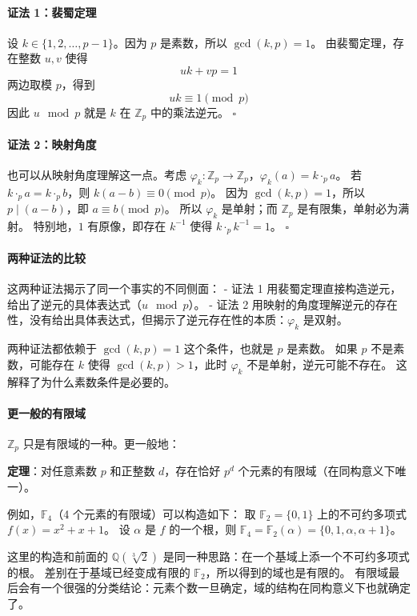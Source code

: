 \paragraph*{证法 1：裴蜀定理}
设 $k \in \{1,2,\ldots,p-1\}$。因为 $p$ 是素数，所以 $\gcd(k,p)=1$。
由裴蜀定理，存在整数 $u,v$ 使得
\[uk + vp = 1\]
两边取模 $p$，得到
\[uk \equiv 1 \pmod{p}\]
因此 $u \mod p$ 就是 $k$ 在 $\mathbb{Z}_p$ 中的乘法逆元。 $\square$

\paragraph*{证法 2：映射角度}
也可以从映射角度理解这一点。考虑 $\varphi_k: \mathbb{Z}_p \to \mathbb{Z}_p$，$\varphi_k(a) = k \cdot_p a$。
若 $k \cdot_p a = k \cdot_p b$，则 $k(a - b) \equiv 0 \pmod{p}$。
因为 $\gcd(k, p) = 1$，所以 $p \mid (a - b)$，即 $a \equiv b \pmod{p}$。
所以 $\varphi_k$ 是单射；而 $\mathbb{Z}_p$ 是有限集，单射必为满射。
特别地，$1$ 有原像，即存在 $k^{-1}$ 使得 $k \cdot_p k^{-1} = 1$。 $\square$

\paragraph*{两种证法的比较}
这两种证法揭示了同一个事实的不同侧面：
- 证法 1 用裴蜀定理直接构造逆元，给出了逆元的具体表达式（$u \mod p$）。
- 证法 2 用映射的角度理解逆元的存在性，没有给出具体表达式，但揭示了逆元存在性的本质：$\varphi_k$ 是双射。

两种证法都依赖于 $\gcd(k, p) = 1$ 这个条件，也就是 $p$ 是素数。
如果 $p$ 不是素数，可能存在 $k$ 使得 $\gcd(k, p) > 1$，此时 $\varphi_k$ 不是单射，逆元可能不存在。
这解释了为什么素数条件是必要的。

\paragraph*{更一般的有限域}
$\mathbb{Z}_p$ 只是有限域的一种。更一般地：

\textbf{定理}：对任意素数 $p$ 和正整数 $d$，存在恰好 $p^d$ 个元素的有限域（在同构意义下唯一）。

例如，$\mathbb{F}_4$（4 个元素的有限域）可以构造如下：
取 $\mathbb{F}_2 = \{0, 1\}$ 上的不可约多项式 $f(x) = x^2 + x + 1$。
设 $\alpha$ 是 $f$ 的一个根，则 $\mathbb{F}_4 = \mathbb{F}_2(\alpha) = \{0, 1, \alpha, \alpha + 1\}$。

这里的构造和前面的 $\mathbb{Q}(\sqrt[3]{2})$ 是同一种思路：在一个基域上添一个不可约多项式的根。
差别在于基域已经变成有限的 $\mathbb{F}_2$，所以得到的域也是有限的。
有限域最后会有一个很强的分类结论：元素个数一旦确定，域的结构在同构意义下也就确定了。

